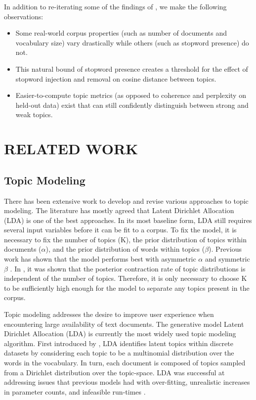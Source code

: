 \documentclass[letterpaper, 10 pt, conference]{ieeeconf}  %
\begin{document}
In addition to re-iterating some of the findings of \cite{tang2014understanding}, we make the following observations:
\begin{itemize}
\item Some real-world corpus properties (such as number of documents and vocabulary size) vary drastically while others (such as stopword presence) do not.
\item This natural bound of stopword presence creates a threshold for the effect of stopword injection and removal on cosine distance between topics.
\item Easier-to-compute topic metrics (as opposed to coherence and perplexity on held-out data) exist that can still confidently distinguish between strong and weak topics.
\end{itemize}

\section{RELATED WORK}

\subsection{Topic Modeling}
There has been extensive work to develop and revise various approaches to topic modeling. The literature has mostly agreed that Latent Dirichlet Allocation (LDA) \cite{blei2003latent} is one of the best approaches. In its most baseline form, LDA still requires several input variables before it can be fit to a corpus. To fix the model, it is necessary to fix the number of topics (K), the prior distribution of topics within documents ($\alpha$), and the prior distribution of words within topics ($\beta$). Previous work has shown that the model performs best with asymmetric $\alpha$ and symmetric $\beta$ \cite{wallach2009rethinking}. In \cite{tang2014understanding}, it was shown that the posterior contraction rate of topic distributions is independent of the number of topics. Therefore, it is only necessary to choose K to be sufficiently high enough for the model to separate any topics present in the corpus.

Topic modeling addresses the desire to improve user experience when encountering large availability of text documents. The generative model Latent Dirichlet Allocation (LDA) is currently the most widely used topic modeling algorithm. First introduced by \cite{blei2003latent}, LDA identifies latent topics within discrete datasets by considering each topic to be a multinomial distribution over the words in the vocabulary. In turn, each document is composed of topics sampled from a Dirichlet distribution over the topic-space. LDA was successful at addressing issues that previous models had with over-fitting, unrealistic increases in parameter counts, and infeasible run-times \cite{blei2003latent}.
\end{document}
